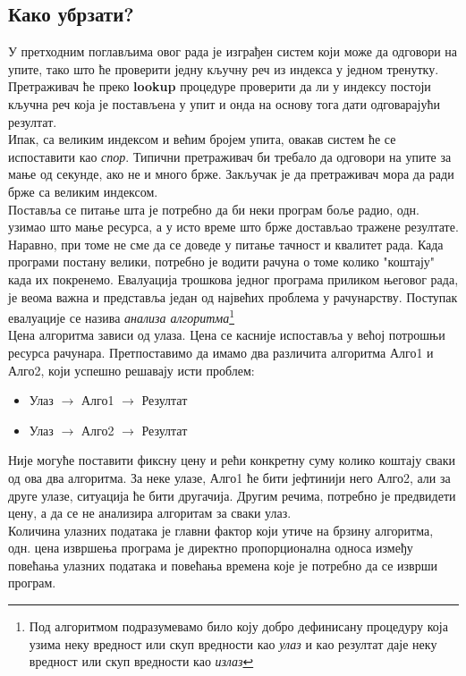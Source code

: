 \documentclass[11pt, serbianc, english, titlepage]{article}
\begin{document}
	\subsection{Како убрзати?}
	У претходним поглављима овог рада је изграђен систем који може да одговори на упите, тако што ће проверити једну кључну реч из индекса у једном тренутку. Претраживач ће преко \textbf{lookup} процедуре проверити да ли у индексу постоји кључна реч која је постављена у упит и онда на основу тога дати одговарајући резултат. \\
	Ипак, са великим индексом и већим бројем упита, овакав систем ће се испоставити као \emph{спор}. Типични претраживач би требало да одговори на упите за мање од секунде, ако не и много брже. Закључак је да претраживач мора да ради брже са великим индексом.\\
	Поставља се питање шта је потребно да би неки програм боље радио, одн. узимао што мање ресурса, а у исто време што брже достављао тражене резултате. Наравно, при томе не сме да се доведе у питање тачност и квалитет рада. Када програми постану велики, потребно је водити рачуна о томе колико "коштају" када их покренемо. Евалуација трошкова једног програма приликом његовог рада, је веома важна и представља један од највећих проблема у рачунарству. Поступак евалуације се назива \emph{анализа алгоритма}\footnote{Под алгоритмом подразумевамо било коју добро дефинисану процедуру која узима неку вредност или скуп вредности као \emph{улаз} и као резултат даје неку вредност или скуп вредности као \emph{излаз}\cite{cormen2001introduction}}\\
	Цена алгоритма зависи од улаза. Цена се касније испоставља у већој потрошњи ресурса рачунара. Претпоставимо да имамо два различита алгоритма Алго1 и Алго2, који успешно решавају исти проблем:
	\begin{itemize}
	\item Улаз $\longrightarrow$ Алго1 $\longrightarrow$ Резултат
	\item Улаз $\longrightarrow$ Алго2 $\longrightarrow$ Резултат
	\end{itemize}
	Није могуће поставити фиксну цену и рећи конкретну суму колико коштају сваки од ова два алгоритма. За неке улазе, Алго1 ће бити јефтинији него Алго2, али за друге улазе, ситуација ће бити другачија. Другим речима, потребно је предвидети цену, а да се не анализира алгоритам за сваки улаз. \\
	Количина улазних података је главни фактор који утиче на брзину алгоритма, одн. цена извршења програма је директно пропорционална односа између повећања улазних података и повећања времена које је потребно да се изврши програм. \\
\end{document}
